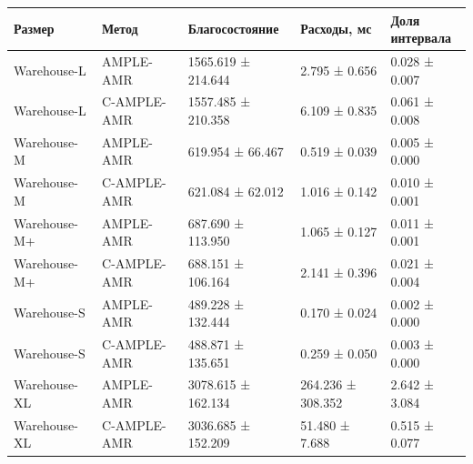 \begin{tabular}{lllll}
\toprule
 Размер & Метод & Благосостояние & Расходы, мс & \shortstack{Доля\\интервала} \\
\midrule
 Warehouse-L & AMPLE-AMR & 1565.619 ± 214.644 & 2.795 ± 0.656 & 0.028 ± 0.007 \\
 Warehouse-L & C-AMPLE-AMR & 1557.485 ± 210.358 & 6.109 ± 0.835 & 0.061 ± 0.008 \\
 Warehouse-M & AMPLE-AMR & 619.954 ± 66.467 & 0.519 ± 0.039 & 0.005 ± 0.000 \\
 Warehouse-M & C-AMPLE-AMR & 621.084 ± 62.012 & 1.016 ± 0.142 & 0.010 ± 0.001 \\
 Warehouse-M+ & AMPLE-AMR & 687.690 ± 113.950 & 1.065 ± 0.127 & 0.011 ± 0.001 \\
 Warehouse-M+ & C-AMPLE-AMR & 688.151 ± 106.164 & 2.141 ± 0.396 & 0.021 ± 0.004 \\
 Warehouse-S & AMPLE-AMR & 489.228 ± 132.444 & 0.170 ± 0.024 & 0.002 ± 0.000 \\
 Warehouse-S & C-AMPLE-AMR & 488.871 ± 135.651 & 0.259 ± 0.050 & 0.003 ± 0.000 \\
 Warehouse-XL & AMPLE-AMR & 3078.615 ± 162.134 & 264.236 ± 308.352 & 2.642 ± 3.084 \\
 Warehouse-XL & C-AMPLE-AMR & 3036.685 ± 152.209 & 51.480 ± 7.688 & 0.515 ± 0.077 \\
\bottomrule
\end{tabular}
